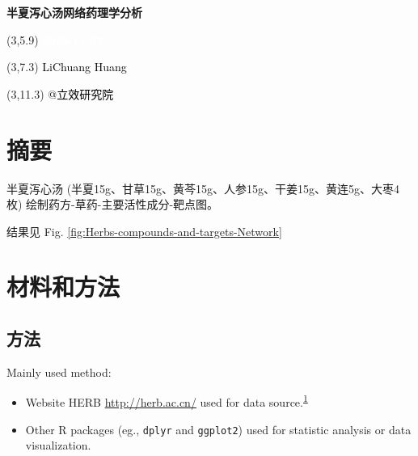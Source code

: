 \documentclass[
]{article}
\author{}
\date{\vspace{-2.5em}}
\providecommand{\tightlist}{%
  \setlength{\itemsep}{0pt}\setlength{\parskip}{0pt}}
\begin{document}
\begin{titlepage} 
\begin{center} \textbf{\Huge
半夏泻心汤网络药理学分析} \vspace{4em}
\begin{textblock}{10}(3,5.9) \huge
\textbf{\textcolor{white}{2023-12-07}}
\end{textblock} \begin{textblock}{10}(3,7.3)
\Large \textcolor{black}{LiChuang Huang}
\end{textblock} \begin{textblock}{10}(3,11.3)
\Large \textcolor{black}{@立效研究院}
\end{textblock} \end{center} \end{titlepage}
\restoregeometry


\tableofcontents

\listoffigures

\listoftables

\newpage


\hypertarget{abstract}{%
\section{摘要}\label{abstract}}

半夏泻心汤 (半夏15g、甘草15g、黄芩15g、人参15g、干姜15g、黄连5g、大枣4枚) 绘制药方-草药-主要活性成分-靶点图。

结果见 Fig. \ref{fig:Herbs-compounds-and-targets-Network}

\hypertarget{methods}{%
\section{材料和方法}\label{methods}}

\hypertarget{ux65b9ux6cd5}{%
\subsection{方法}\label{ux65b9ux6cd5}}

Mainly used method:

\begin{itemize}
\tightlist
\item
  Website HERB \url{http://herb.ac.cn/} used for data source.\textsuperscript{\protect\hyperlink{ref-HerbAHighThFang2021}{1}}
\item
  Other R packages (eg., \texttt{dplyr} and \texttt{ggplot2}) used for statistic analysis or data visualization.
\end{itemize}
\end{document}
